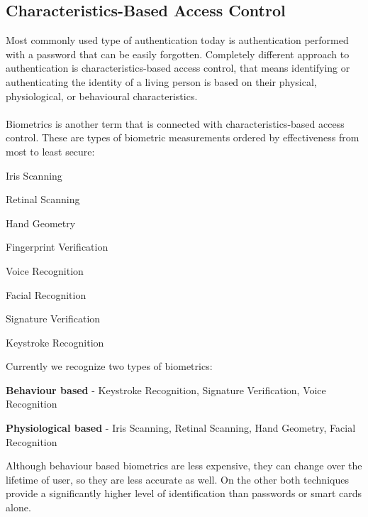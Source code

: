 \documentclass[twoside]{article}
\begin{document}
\begin{multicols}{2}

\section{Characteristics-Based Access Control}
Most commonly used type of authentication today is authentication performed with a password that can be easily forgotten. Completely different approach to authentication is characteristics-based access control, that means identifying or authenticating the identity of a living person is based on their physical, physiological, or behavioural characteristics.
\\\\
Biometrics is another term that is connected with characteristics-based access control.
These are types of biometric measurements ordered by effectiveness from most to least secure:
\begin{compactitem}
\item Iris Scanning
\item Retinal Scanning
\item Hand Geometry
\item Fingerprint Verification
\item Voice Recognition
\item Facial Recognition
\item Signature Verification
\item Keystroke Recognition
\end{compactitem}
Currently we recognize two types of biometrics:
\begin{compactitem}
\item \textbf{Behaviour based} - Keystroke Recognition, Signature Verification, Voice Recognition
\item \textbf{Physiological based} - Iris Scanning, Retinal Scanning, Hand Geometry, Facial Recognition
\end{compactitem}
Although behaviour based biometrics are less expensive, they can change over the lifetime of user, so they are less accurate as well. On the other both techniques provide a significantly
higher level of identification than passwords or smart cards alone.
 




\end{multicols}
\end{document}
